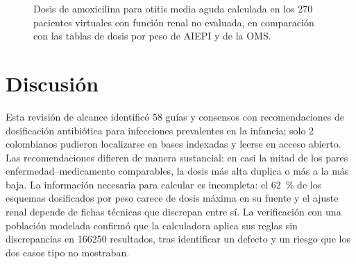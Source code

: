\documentclass[11pt,a4paper]{article}
\begin{document}
\begin{figure}[htbp]
\centering
{}
\caption{Dosis de amoxicilina para otitis media aguda calculada en los 270 pacientes virtuales con función renal no evaluada, en comparación con las tablas de dosis por peso de AIEPI y de la OMS.}
\label{fig:amox}
\end{figure}

\section{Discusión}

Esta revisión de alcance identificó 58 guías y consensos con recomendaciones de dosificación antibiótica para infecciones prevalentes en la infancia; solo 2 colombianos pudieron localizarse en bases indexadas y leerse en acceso abierto. Las recomendaciones difieren de manera sustancial: en casi la mitad de los pares enfermedad--medicamento comparables, la dosis más alta duplica o más a la más baja. La información necesaria para calcular es incompleta: el 62~\% de los esquemas dosificados por peso carece de dosis máxima en su fuente y el ajuste renal depende de fichas técnicas que discrepan entre sí. La verificación con una población modelada confirmó que la calculadora aplica sus reglas sin discrepancias en \num{166250} resultados, tras identificar un defecto y un riesgo que los dos casos tipo no mostraban.
\end{document}
